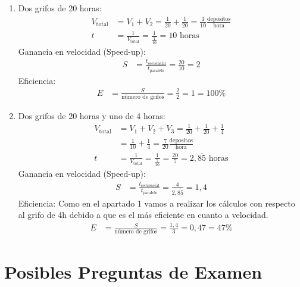 \documentclass[12pt,a4paper]{article}
\begin{document}
\begin{enumerate}
		\item Dos grifos de 20 horas:
		\begin{align*}
			V_{\text{total}} &= V_1 + V_2 = \frac{1}{20} + \frac{1}{20} = \frac{1}{10} \frac{\text{depositos}}{\text{hora}} \\
			t &= \frac{1}{V_{\text{total}}} = \frac{1}{\frac{1}{10}} = 10 \text{ horas}
		\end{align*}
		Ganancia en velocidad (Speed-up):
		\begin{align*}
			S &= \frac{t_{\text{secuencial}}}{t_{\text{paralelo}}} = \frac{20}{10} = 2
		\end{align*}
		Eficiencia:
		\begin{align*}
			E &= \frac{S}{\text{número de grifos}} = \frac{2}{2} = 1 = 100\%
		\end{align*}
		
		\item Dos grifos de 20 horas y uno de 4 horas:
		\begin{align*}
			V_{\text{total}} &= V_1 + V_2 + V_3 = \frac{1}{20} + \frac{1}{20} + \frac{1}{4} \\
			&= \frac{1}{10} + \frac{1}{4} = \frac{7}{20} \frac{\text{depositos}}{\text{hora}} \\
			t &= \frac{1}{V_{\text{total}}} = \frac{1}{\frac{7}{20}} = \frac{20}{7} = 2,\overline{85} \text{ horas}
		\end{align*}
		Ganancia en velocidad (Speed-up):
		\begin{align*}
			S &= \frac{t_{\text{secuencial}}}{t_{\text{paralelo}}} = \frac{4}{2,\overline{85}} = 1,4
		\end{align*}
		Eficiencia:  \newline
		Como en el apartado 1 vamos a realizar los cálculos con respecto al grifo de 4h debido a que es el más eficiente en cuanto a velocidad. 
		\begin{align*}
			E &= \frac{S}{\text{número de grifos}} = \frac{1,4}{3} = 0,47 = 47\%
		\end{align*}
	\end{enumerate}
	
	\newpage
	
	\section{Posibles Preguntas de Examen}
	
\end{document}
